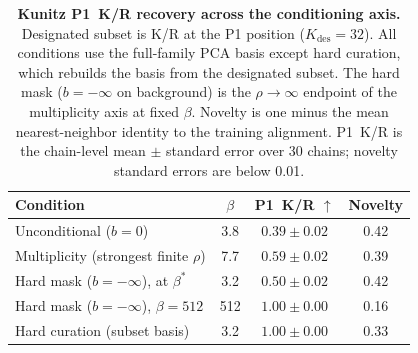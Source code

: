 \documentclass{article}
\theoremstyle{definition}
\theoremstyle{remark}
\begin{document}
\begin{table}[t]
  \centering
  \caption{\textbf{Kunitz P1~K/R recovery across the conditioning axis.} Designated
  subset is K/R at the P1 position ($K_{\mathrm{des}} = 32$). All conditions use the
  full-family PCA basis except hard curation, which rebuilds the basis from the
  designated subset. The hard mask ($b = -\infty$ on background) is the
  $\rho \to \infty$ endpoint of the multiplicity axis at fixed $\beta$. Novelty is one
  minus the mean nearest-neighbor identity to the training alignment. P1~K/R is the chain-level
  mean $\pm$ standard error over 30 chains; novelty standard errors are below 0.01.}
  \label{tab:mask-recovery}
  \begin{tabular}{@{}lccc@{}}
    \toprule
    Condition & $\beta$ & P1~K/R $\uparrow$ & Novelty \\
    \midrule
    Unconditional ($b = 0$)                      & 3.8 & $0.39 \pm 0.02$ & 0.42 \\
    Multiplicity (strongest finite $\rho$)       & 7.7 & $0.59 \pm 0.02$ & 0.39 \\
    Hard mask ($b = -\infty$), at $\beta^{*}$    & 3.2 & $0.50 \pm 0.02$ & 0.42 \\
    Hard mask ($b = -\infty$), $\beta = 512$     & 512 & $1.00 \pm 0.00$ & 0.16 \\
    Hard curation (subset basis)                 & 3.2 & $1.00 \pm 0.00$ & 0.33 \\
    \bottomrule
  \end{tabular}
\end{table}
\end{document}
